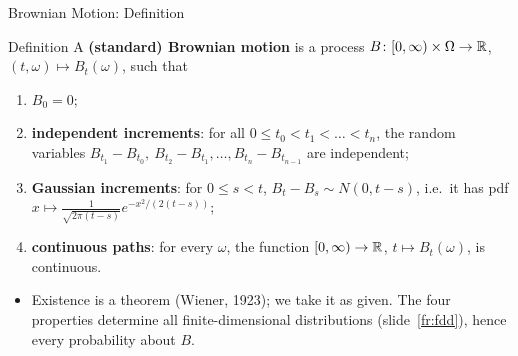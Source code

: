 \begin{frame}{Brownian Motion: Definition}
  \label{fr:bmdef}
  \small
  \begin{block}{Definition}
    A \textbf{(standard) Brownian motion} is a process $B\colon[0,\infty)\times\Omega\to\mathbb{R}$, $(t,\omega)\mapsto B_t(\omega)$, such that
    \begin{enumerate}
      \item[(i)] $B_0=0$;
      \item[(ii)] \textbf{independent increments}: for all $0\le t_0<t_1<\dots<t_n$, the random variables $B_{t_1}-B_{t_0},\ B_{t_2}-B_{t_1},\dots,B_{t_n}-B_{t_{n-1}}$ are independent;
      \item[(iii)] \textbf{Gaussian increments}: for $0\le s<t$, $B_t-B_s\sim N(0,t-s)$, i.e.\ it has pdf $x\mapsto\frac{1}{\sqrt{2\pi(t-s)}}e^{-x^2/(2(t-s))}$;
      \item[(iv)] \textbf{continuous paths}: for every $\omega$, the function $[0,\infty)\to\mathbb{R}$, $t\mapsto B_t(\omega)$, is continuous.
    \end{enumerate}
  \end{block}
  \begin{itemize}
    \item Existence is a theorem (Wiener, 1923); we take it as given. The four properties determine all finite-dimensional distributions (slide~\ref{fr:fdd}), hence every probability about $B$.
  \end{itemize}
\end{frame}

